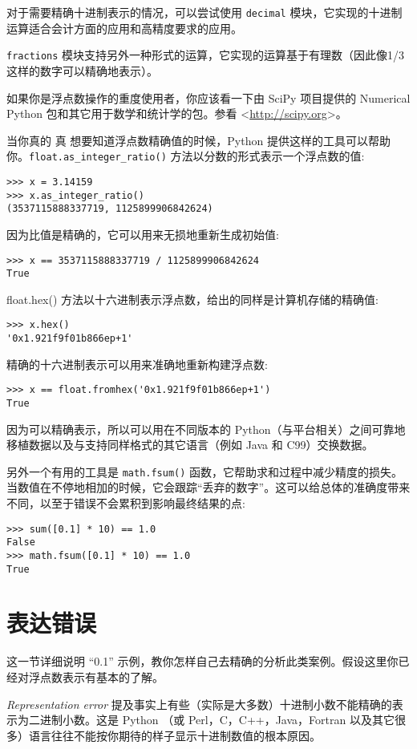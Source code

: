 对于需要精确十进制表示的情况，可以尝试使用 \texttt{decimal} 模块，它实现的十进制运算适合会计方面的应用和高精度要求的应用。

\texttt{fractions} 模块支持另外一种形式的运算，它实现的运算基于有理数（因此像1/3这样的数字可以精确地表示）。

如果你是浮点数操作的重度使用者，你应该看一下由 SciPy 项目提供的 Numerical Python 包和其它用于数学和统计学的包。参看 \textless \url{http://scipy.org}\textgreater。
\begin{sloppypar} %
当你真的 真 想要知道浮点数精确值的时候，Python 提供这样的工具可以帮助你。\texttt{float.as\_integer\_ratio()} 方法以分数的形式表示一个浮点数的值:
\end{sloppypar}
\begin{lstlisting}
>>> x = 3.14159
>>> x.as_integer_ratio()
(3537115888337719, 1125899906842624)
\end{lstlisting}
因为比值是精确的，它可以用来无损地重新生成初始值:
\begin{lstlisting}
>>> x == 3537115888337719 / 1125899906842624
True
\end{lstlisting}
float.hex() 方法以十六进制表示浮点数，给出的同样是计算机存储的精确值:
\begin{lstlisting}
>>> x.hex()
'0x1.921f9f01b866ep+1'
\end{lstlisting}
精确的十六进制表示可以用来准确地重新构建浮点数:
\begin{lstlisting}
>>> x == float.fromhex('0x1.921f9f01b866ep+1')
True
\end{lstlisting}
因为可以精确表示，所以可以用在不同版本的 Python（与平台相关）之间可靠地移植数据以及与支持同样格式的其它语言（例如 Java 和 C99）交换数据。

另外一个有用的工具是 \texttt{math.fsum()} 函数，它帮助求和过程中减少精度的损失。当数值在不停地相加的时候，它会跟踪“丢弃的数字”。这可以给总体的准确度带来不同，以至于错误不会累积到影响最终结果的点:
\begin{lstlisting}
>>> sum([0.1] * 10) == 1.0
False
>>> math.fsum([0.1] * 10) == 1.0
True
\end{lstlisting}
\section{表达错误}
这一节详细说明 “0.1” 示例，教你怎样自己去精确的分析此类案例。假设这里你已经对浮点数表示有基本的了解。

\textit{Representation error} 提及事实上有些（实际是大多数）十进制小数不能精确的表示为二进制小数。这是 Python （或 Perl，C，C++，Java，Fortran 以及其它很多）语言往往不能按你期待的样子显示十进制数值的根本原因。

